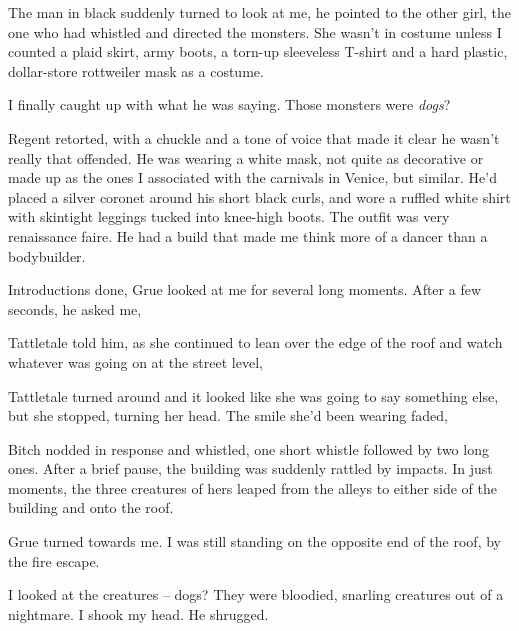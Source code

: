 The man in black suddenly turned to look at me,  he pointed to the other girl, the one who had whistled and directed the monsters. She wasn't in costume unless I counted a plaid skirt, army boots, a torn-up sleeveless T-shirt and a hard plastic, dollar-store rottweiler mask as a costume. 

I finally caught up with what he was saying. Those monsters were {\em dogs}?

 Regent retorted, with a chuckle and a tone of voice that made it clear he wasn't really that offended. He was wearing a white mask, not quite as decorative or made up as the ones I associated with the carnivals in Venice, but similar. He'd placed a silver coronet around his short black curls, and wore a ruffled white shirt with skintight leggings tucked into knee-high boots. The outfit was very renaissance faire. He had a build that made me think more of a dancer than a bodybuilder.

Introductions done, Grue looked at me for several long moments. After a few seconds, he asked me, 

 Tattletale told him, as she continued to lean over the edge of the roof and watch whatever was going on at the street level, 

Tattletale turned around and it looked like she was going to say something else, but she stopped, turning her head. The smile she'd been wearing faded, 

Bitch nodded in response and whistled, one short whistle followed by two long ones. After a brief pause, the building was suddenly rattled by impacts. In just moments, the three creatures of hers leaped from the alleys to either side of the building and onto the roof.

Grue turned towards me. I was still standing on the opposite end of the roof, by the fire escape. 

I looked at the creatures -- dogs? They were bloodied, snarling creatures out of a nightmare. I shook my head. He shrugged.

